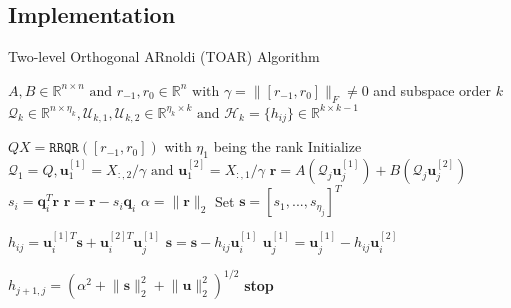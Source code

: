\subsection{Implementation}

 \begin{algorithm}
\caption{Two-level Orthogonal ARnoldi (TOAR) Algorithm}\label{alg:toar}
\begin{algorithmic}[1]
\Require $A,B \in \mathbb{R}^{n \times n} \text{ and } r_{-1}, r_0 \in \mathbb{R}^n \text{ with } \gamma = \lVert [r_{-1},r_0] \rVert_F \neq 0$ and subspace order $k$
\Ensure $\mathcal{Q}_k \in \mathbb{R}^{n \times \eta_k}, \mathcal{U}_{k,1}, \mathcal{U}_{k,2} \in \mathbb{R}^{\eta_k \times k} \text{ and } \mathcal{H}_k = \{h_{ij}\} \in \mathbb{R}^{k\times k-1}$

\State $QX = \mathtt{RRQR}([r_{-1},r_0]) $ with $\eta_1$ being the rank
\State Initialize $\mathcal{Q}_1 = Q, \mathbf{u}_{1}^{[1]} = X_{:,2}/\gamma \text{ and } \mathbf{u}_{1}^{[2]} = X_{:,1}/\gamma$
    \State $\mathbf{r} = A(\mathcal{Q}_j \mathbf{u}_{j}^{[1]}) + B(\mathcal{Q}_j \mathbf{u}_j^{[2]})$
     
        \State $s_i = \mathbf{q}_i^T \mathbf{r}$
        \State $\mathbf{r} = \mathbf{r} - s_i \mathbf{q}_i$
    \EndFor
    \State $\alpha = \lVert \mathbf{r} \rVert_2$
    \State Set $\mathbf{s} = [s_1,...,s_{\eta_j}]^T$

     
        \State $h_{ij} = \mathbf{u}_{i}^{[1]T} \mathbf{s} + \mathbf{u}_i^{[2]T} \mathbf{u}_j^{[1]}$
        \State $ \mathbf{s} = \mathbf{s} - h_{ij}\mathbf{u}_i^{[1]}$
        \State $\mathbf{u}_j^{[1]} = \mathbf{u}_j^{[1]} - h_{ij}\mathbf{u}_i^{[2]}$
    \EndFor

    \State $h_{j+1,j} = (\alpha^2 + \lVert \mathbf{s} \rVert_2^2 +\lVert \mathbf{u} \rVert_2^2 )^{1/2}$
     
        \State \textbf{stop}
    \EndIf


\end{algorithmic}
\end{algorithm}
